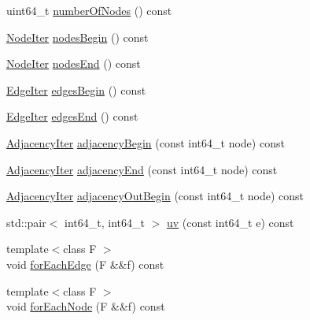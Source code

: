 \begin{DoxyCompactItemize}
uint64\+\_\+t \hyperlink{classnifty_1_1graph_1_1UndirectedGraph_af3450885d48968733f3754544a20c012}{number\+Of\+Nodes} () const
\item 
\hyperlink{classnifty_1_1graph_1_1UndirectedGraph_aac54e4ad3a525489e9b29c1bd4c92c88}{Node\+Iter} \hyperlink{classnifty_1_1graph_1_1UndirectedGraph_aa8d42d0d15cc214e1da4a5c8d0ae4e3e}{nodes\+Begin} () const
\item 
\hyperlink{classnifty_1_1graph_1_1UndirectedGraph_aac54e4ad3a525489e9b29c1bd4c92c88}{Node\+Iter} \hyperlink{classnifty_1_1graph_1_1UndirectedGraph_a8e3e13d42c2770d0d739fa8d65b22c6f}{nodes\+End} () const
\item 
\hyperlink{classnifty_1_1graph_1_1UndirectedGraph_aa37a0dc690ad1257d5eb5105e7d66bba}{Edge\+Iter} \hyperlink{classnifty_1_1graph_1_1UndirectedGraph_a9cd92ddc55ce257585e3b1c34921292b}{edges\+Begin} () const
\item 
\hyperlink{classnifty_1_1graph_1_1UndirectedGraph_aa37a0dc690ad1257d5eb5105e7d66bba}{Edge\+Iter} \hyperlink{classnifty_1_1graph_1_1UndirectedGraph_a390b4171a59695c701258e9e4bd4d796}{edges\+End} () const
\item 
\hyperlink{classnifty_1_1graph_1_1UndirectedGraph_adecb4597d23d097b08c2c03a106bc57b}{Adjacency\+Iter} \hyperlink{classnifty_1_1graph_1_1UndirectedGraph_a51975f5b48920fc9ef2b1283329253d6}{adjacency\+Begin} (const int64\+\_\+t node) const
\item 
\hyperlink{classnifty_1_1graph_1_1UndirectedGraph_adecb4597d23d097b08c2c03a106bc57b}{Adjacency\+Iter} \hyperlink{classnifty_1_1graph_1_1UndirectedGraph_a96a867a0211f95e39a6003feed661aab}{adjacency\+End} (const int64\+\_\+t node) const
\item 
\hyperlink{classnifty_1_1graph_1_1UndirectedGraph_adecb4597d23d097b08c2c03a106bc57b}{Adjacency\+Iter} \hyperlink{classnifty_1_1graph_1_1UndirectedGraph_aeb650cb1aa92c762db247e336c35f352}{adjacency\+Out\+Begin} (const int64\+\_\+t node) const
\item 
std\+::pair$<$ int64\+\_\+t, int64\+\_\+t $>$ \hyperlink{classnifty_1_1graph_1_1UndirectedGraph_a270b13442535d2407d9b0741748d5fb0}{uv} (const int64\+\_\+t e) const
\item 
{\footnotesize template$<$class F $>$ }\\void \hyperlink{classnifty_1_1graph_1_1UndirectedGraph_a6e9c1a754ba6d85b12a44e49f8f0a343}{for\+Each\+Edge} (F \&\&f) const
\item 
{\footnotesize template$<$class F $>$ }\\void \hyperlink{classnifty_1_1graph_1_1UndirectedGraph_a2bd33f944c05eeea7295047378902cb6}{for\+Each\+Node} (F \&\&f) const

\end{DoxyCompactItemize}
